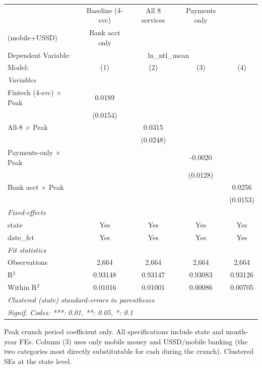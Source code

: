
\begingroup
\centering
\begin{tabular}{lcccc}
   \tabularnewline \midrule \midrule
                                  & Baseline (4-svc) & All 8 services & Payments only\\(mobile+USSD)   & Bank acct only \\   
   Dependent Variable: & \multicolumn{4}{c}{ln\_ntl\_mean}\\
   Model:                         & (1)              & (2)            & (3)                            & (4)\\  
   \midrule
   \emph{Variables}\\
   Fintech (4-svc) $\times$ Peak  & 0.0189           &                &                                &   \\   
                                  & (0.0154)         &                &                                &   \\   
   All-8 $\times$ Peak            &                  & 0.0315         &                                &   \\   
                                  &                  & (0.0248)       &                                &   \\   
   Payments-only $\times$ Peak    &                  &                & -0.0020                        &   \\   
                                  &                  &                & (0.0128)                       &   \\   
   Bank acct $\times$ Peak        &                  &                &                                & 0.0256\\   
                                  &                  &                &                                & (0.0153)\\   
   \midrule
   \emph{Fixed-effects}\\
   state                          & Yes              & Yes            & Yes                            & Yes\\  
   date\_fct                      & Yes              & Yes            & Yes                            & Yes\\  
   \midrule
   \emph{Fit statistics}\\
   Observations                   & 2,664            & 2,664          & 2,664                          & 2,664\\  
   R$^2$                          & 0.93148          & 0.93147        & 0.93083                        & 0.93126\\  
   Within R$^2$                   & 0.01016          & 0.01001        & 0.00086                        & 0.00705\\  
   \midrule \midrule
   \multicolumn{5}{l}{\emph{Clustered (state) standard-errors in parentheses}}\\
   \multicolumn{5}{l}{\emph{Signif. Codes: ***: 0.01, **: 0.05, *: 0.1}}\\
\end{tabular}
 
\par \raggedright 
Peak crunch period coefficient only. All specifications include state and month-year FEs. Column (3) uses only mobile money and USSD/mobile banking (the two categories most directly substitutable for cash during the crunch). Clustered SEs at the state level.
\par\endgroup


